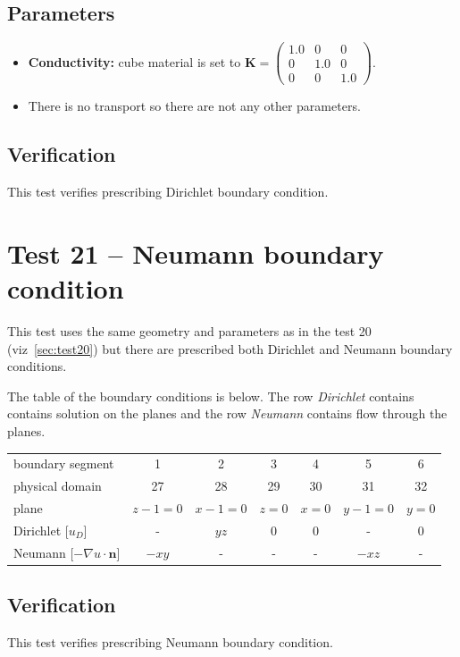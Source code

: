 \subsection*{Parameters}
\begin{itemize}
  \item \textbf{Conductivity:} cube material is set to $\mathbf{K}=\left(\begin{array}{ccc} 1.0 & 0 & 0 \\ 0 & 1.0 & 0 \\ 0 & 0 & 1.0\end{array} \right)$.
  \item There is no transport so there are not any other parameters.
\end{itemize}

\subsection*{Verification}
This test verifies prescribing Dirichlet boundary condition.


\section{Test 21 -- Neumann boundary condition}
\label{sec:test21}
This test uses the same geometry and parameters as in the test 20 (viz~\ref{sec:test20}) but there are prescribed both Dirichlet and Neumann boundary conditions. 

The table of the boundary conditions is below. The row \emph{Dirichlet} contains contains solution on the planes and the row \emph{Neumann} contains flow through the planes.

\begin{center}
  \begin{tabular}{|l|c|c|c|c|c|c|}
      \hline
      boundary segment & 1 & 2 & 3 & 4 & 5 & 6 \\ 
      physical domain & 27 & 28 & 29 & 30 & 31 & 32 \\ 
      plane & $z-1=0$  & $x-1=0$ & $z=0$ & $x=0$ & $y-1=0$& $y=0$\\
      Dirichlet [$u_D$] 
	  &   -   & $yz$ & $0$ & $0$ &   -   & $0$\\
      Neumann [$-\nabla{}u\cdot{}\mathbf{n}$] 
	  & $-xy$ &   -  &  -  &  -  & $-xz$ & - \\
      \hline
  \end{tabular}
\end{center}

\subsection*{Verification}
This test verifies prescribing Neumann boundary condition.

